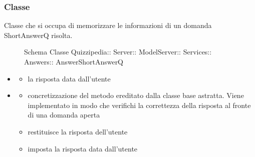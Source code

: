 \subsubsection{Classe }
Classe che si occupa di memorizzare le informazioni di un domanda ShortAnswerQ risolta.
\begin{figure}[H]
\centering
\noindent{}
\caption[Schema Classe AnswerShortAnswerQ]{Schema Classe Quizzipedia:: Server:: ModelServer:: Services:: Answers:: AnswerShortAnswerQ}
\end{figure}
\begin{itemize}
\item {}
\begin{itemize}
\item {}
\newline
la risposta data dall'utente
\end{itemize}
\item {}
\begin{itemize}
\item {}
\newline
concretizzazione del metodo ereditato dalla classe base astratta. Viene implementato in modo che verifichi la correttezza della risposta al fronte di una domanda aperta
\newline
\item {}
\newline
restituisce la risposta dell'utente
\newline
\item {}
\newline
imposta la risposta data dall'utente
\newline
\end{itemize}
\end{itemize}
